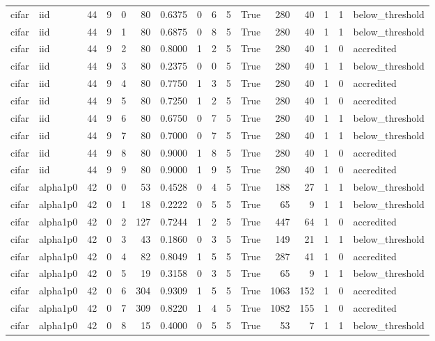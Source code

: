 \begin{tabular}{llrrrrrrrrrrrrrl}
cifar & iid & 44 & 9 & 0 & 80 & 0.6375 & 0 & 6 & 5 & True & 280 & 40 & 1 & 1 & below\_threshold \\
cifar & iid & 44 & 9 & 1 & 80 & 0.6875 & 0 & 8 & 5 & True & 280 & 40 & 1 & 1 & below\_threshold \\
cifar & iid & 44 & 9 & 2 & 80 & 0.8000 & 1 & 2 & 5 & True & 280 & 40 & 1 & 0 & accredited \\
cifar & iid & 44 & 9 & 3 & 80 & 0.2375 & 0 & 0 & 5 & True & 280 & 40 & 1 & 1 & below\_threshold \\
cifar & iid & 44 & 9 & 4 & 80 & 0.7750 & 1 & 3 & 5 & True & 280 & 40 & 1 & 0 & accredited \\
cifar & iid & 44 & 9 & 5 & 80 & 0.7250 & 1 & 2 & 5 & True & 280 & 40 & 1 & 0 & accredited \\
cifar & iid & 44 & 9 & 6 & 80 & 0.6750 & 0 & 7 & 5 & True & 280 & 40 & 1 & 1 & below\_threshold \\
cifar & iid & 44 & 9 & 7 & 80 & 0.7000 & 0 & 7 & 5 & True & 280 & 40 & 1 & 1 & below\_threshold \\
cifar & iid & 44 & 9 & 8 & 80 & 0.9000 & 1 & 8 & 5 & True & 280 & 40 & 1 & 0 & accredited \\
cifar & iid & 44 & 9 & 9 & 80 & 0.9000 & 1 & 9 & 5 & True & 280 & 40 & 1 & 0 & accredited \\
cifar & alpha1p0 & 42 & 0 & 0 & 53 & 0.4528 & 0 & 4 & 5 & True & 188 & 27 & 1 & 1 & below\_threshold \\
cifar & alpha1p0 & 42 & 0 & 1 & 18 & 0.2222 & 0 & 5 & 5 & True & 65 & 9 & 1 & 1 & below\_threshold \\
cifar & alpha1p0 & 42 & 0 & 2 & 127 & 0.7244 & 1 & 2 & 5 & True & 447 & 64 & 1 & 0 & accredited \\
cifar & alpha1p0 & 42 & 0 & 3 & 43 & 0.1860 & 0 & 3 & 5 & True & 149 & 21 & 1 & 1 & below\_threshold \\
cifar & alpha1p0 & 42 & 0 & 4 & 82 & 0.8049 & 1 & 5 & 5 & True & 287 & 41 & 1 & 0 & accredited \\
cifar & alpha1p0 & 42 & 0 & 5 & 19 & 0.3158 & 0 & 3 & 5 & True & 65 & 9 & 1 & 1 & below\_threshold \\
cifar & alpha1p0 & 42 & 0 & 6 & 304 & 0.9309 & 1 & 5 & 5 & True & 1063 & 152 & 1 & 0 & accredited \\
cifar & alpha1p0 & 42 & 0 & 7 & 309 & 0.8220 & 1 & 4 & 5 & True & 1082 & 155 & 1 & 0 & accredited \\
cifar & alpha1p0 & 42 & 0 & 8 & 15 & 0.4000 & 0 & 5 & 5 & True & 53 & 7 & 1 & 1 & below\_threshold \\

\end{tabular}
